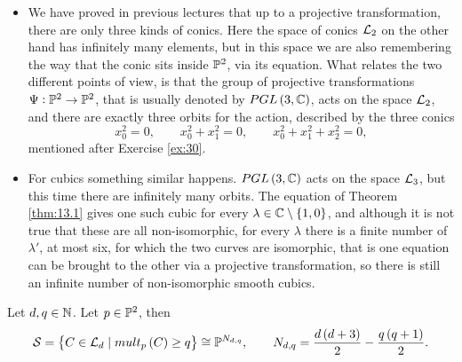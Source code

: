 \begin{remark}
\hfill
\begin{itemize}
\item We have proved in previous lectures that up to a projective transformation, there are only three kinds of conics. Here the space of conics $ \LL_2 $ on the other hand has infinitely many elements, but in this space we are also remembering the way that the conic sits inside $ \P^2 $, via its equation. What relates the two different points of view, is that the group of projective transformations $ \Psi : \P^2 \to \P^2 $, that is usually denoted by $ PGL\br{3, \C} $, acts on the space $ \LL_2 $, and there are exactly three orbits for the action, described by the three conics
$$ x_0^2 = 0, \qquad x_0^2 + x_1^2 = 0, \qquad x_0^2 + x_1^2 + x_2^2 = 0, $$
mentioned after Exercise \ref{ex:30}.
\item For cubics something similar happens. $ PGL\br{3, \C} $ acts on the space $ \LL_3 $, but this time there are infinitely many orbits. The equation of Theorem \ref{thm:13.1} gives one such cubic for every $ \lambda \in \C \setminus \cbr{1, 0} $, and although it is not true that these are all non-isomorphic, for every $ \lambda $ there is a finite number of $ \lambda' $, at most six, for which the two curves are isomorphic, that is one equation can be brought to the other via a projective transformation, so there is still an infinite number of non-isomorphic smooth cubics.
\end{itemize}
\end{remark}

\pagebreak

\begin{lemma}
\label{lem:14.6}
Let $ d, q \in \N $. Let $ p \in \P^2 $, then
$$ \SS = \cbr{C \in \LL_d \mid mult_p\br{C} \ge q} \cong \P^{N_{d, q}}, \qquad N_{d, q} = \dfrac{d\br{d + 3}}{2} - \dfrac{q\br{q + 1}}{2}. $$
\end{lemma}

